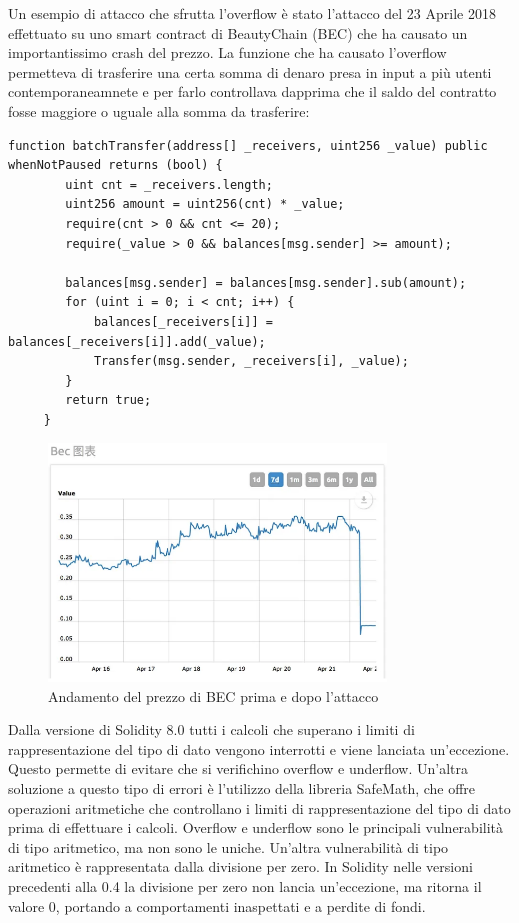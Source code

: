 \documentclass[../../Thesis.tex]{subfiles}
\begin{document}
Un esempio di attacco che sfrutta l'overflow è stato l'attacco del 23 Aprile 2018 effettuato su uno smart contract di BeautyChain (BEC) che ha causato un importantissimo crash del prezzo. La funzione che ha causato l'overflow permetteva di trasferire una certa somma di denaro presa in input a più utenti contemporaneamnete e per farlo controllava dapprima che il saldo del contratto fosse maggiore o uguale alla somma da trasferire:
\begin{lstlisting}[language=Solidity]
    function batchTransfer(address[] _receivers, uint256 _value) public whenNotPaused returns (bool) {
        uint cnt = _receivers.length;
        uint256 amount = uint256(cnt) * _value;
        require(cnt > 0 && cnt <= 20);
        require(_value > 0 && balances[msg.sender] >= amount);
    
        balances[msg.sender] = balances[msg.sender].sub(amount);
        for (uint i = 0; i < cnt; i++) {
            balances[_receivers[i]] = balances[_receivers[i]].add(_value);
            Transfer(msg.sender, _receivers[i], _value);
        }
        return true;
     }
\end{lstlisting}
\begin{figure}[H]
    \centering
    \includegraphics[width=0.8\textwidth]{../../img/BECPrice.png}
    \caption{Andamento del prezzo di BEC prima e dopo  l'attacco}
    \label{fig:BECPrice}
\end{figure}
Dalla versione di Solidity 8.0  tutti i calcoli che superano i limiti di rappresentazione del tipo di dato vengono interrotti e viene lanciata un'eccezione. Questo permette di evitare che si verifichino overflow e underflow. Un'altra soluzione a questo tipo di errori è l'utilizzo della libreria SafeMath, che offre operazioni aritmetiche che controllano i limiti di rappresentazione del tipo di dato prima di effettuare i calcoli. Overflow e underflow sono le principali vulnerabilità di tipo aritmetico, ma non sono le uniche. Un'altra vulnerabilità di tipo aritmetico è rappresentata dalla divisione per zero. In Solidity nelle versioni precedenti alla 0.4 la divisione per zero non lancia un'eccezione, ma ritorna il valore 0, portando a comportamenti inaspettati e a perdite di fondi.
\end{document}
